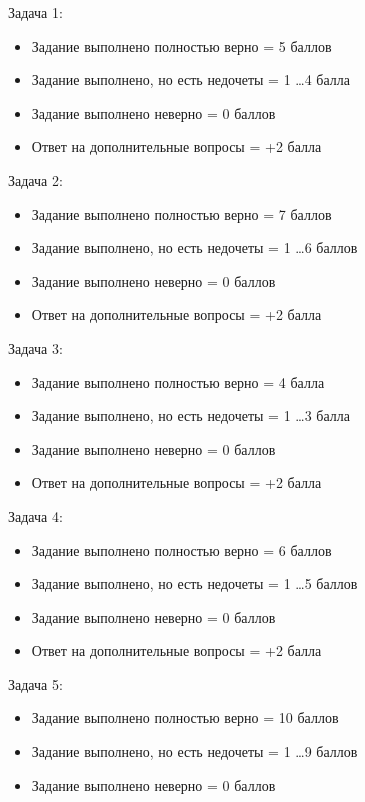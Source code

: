 \markSection

Задача 1:

\begin{itemize}
    \item	Задание выполнено полностью верно = 5 баллов 
    \item	Задание выполнено, но есть недочеты = 1 \dots 4 балла
    \item	Задание выполнено неверно = 0 баллов
    \item	Ответ на дополнительные вопросы = +2 балла
\end{itemize}

Задача 2:

\begin{itemize}
    \item	Задание выполнено полностью верно = 7 баллов 
    \item	Задание выполнено, но есть недочеты = 1 \dots 6 баллов
    \item	Задание выполнено неверно = 0 баллов
    \item	Ответ на дополнительные вопросы = +2 балла
\end{itemize}

Задача 3:

\begin{itemize}
    \item	Задание выполнено полностью верно = 4 балла 
    \item	Задание выполнено, но есть недочеты = 1 \dots 3 балла
    \item	Задание выполнено неверно = 0 баллов
    \item	Ответ на дополнительные вопросы = +2 балла
\end{itemize}

Задача 4:

\begin{itemize}
    \item	Задание выполнено полностью верно = 6 баллов 
    \item	Задание выполнено, но есть недочеты = 1 \dots 5 баллов
    \item	Задание выполнено неверно = 0 баллов
    \item	Ответ на дополнительные вопросы = +2 балла
\end{itemize}

Задача 5:

\begin{itemize}    
    \item Задание выполнено полностью верно = 10 баллов
    \item Задание выполнено, но есть недочеты = 1 \dots 9 баллов
    \item Задание выполнено неверно = 0 баллов
\end{itemize}

